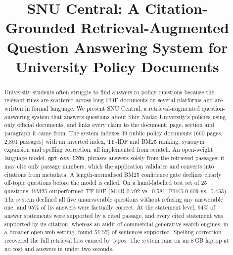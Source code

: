 \documentclass[conference]{IEEEtran}
\newcommand{\code}[1]{\texttt{#1}}
\begin{document}
\title{SNU Central: A Citation-Grounded Retrieval-Augmented Question Answering System for University Policy Documents}

\author{
}

\maketitle

\begin{abstract}
University students often struggle to find answers to policy questions because the relevant rules are scattered across long PDF documents on several platforms and are written in formal language. We present SNU Central, a retrieval-augmented question-answering system that answers questions about Shiv Nadar University's policies using only official documents, and links every claim to the document, page, section and paragraph it came from. The system indexes 39 public policy documents (660 pages, 2{,}801 passages) with an inverted index, TF-IDF and BM25 ranking, synonym expansion and spelling correction, all implemented from scratch. An open-weight language model, \code{gpt-oss-120b}, phrases answers solely from the retrieved passages; it may cite only passage numbers, which the application validates and converts into citations from metadata. A length-normalised BM25 confidence gate declines clearly off-topic questions before the model is called. On a hand-labelled test set of 25 questions, BM25 outperformed TF-IDF (MRR 0.792 vs.\ 0.581; F1@5 0.609 vs.\ 0.453). The system declined all five unanswerable questions without refusing any answerable one, and 95\% of its answers were factually correct. At the statement level, 94\% of answer statements were supported by a cited passage, and every cited statement was supported by its citation, whereas an audit of commercial generative search engines, in a broader open-web setting, found 51.5\% of sentences supported. Spelling correction recovered the full retrieval loss caused by typos. The system runs on an 8\,GB laptop at no cost and answers in under two seconds.
\end{abstract}
\end{document}
